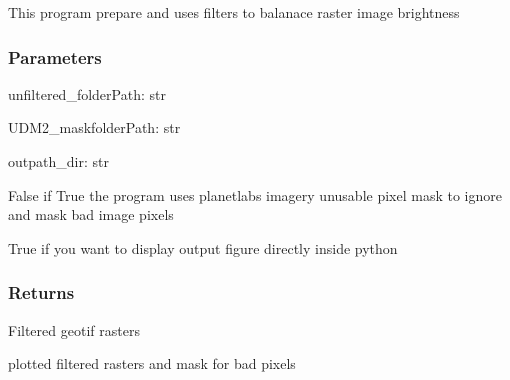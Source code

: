 \documentclass[letterpaper,10pt]{sphinxmanual}
\begin{document}
\begin{fulllineitems}
\label{\detokenize{generated/akhdefo_functions.Filter_PreProcess:akhdefo_functions.Filter_PreProcess}}
\pysigstartsignatures
{}
\pysigstopsignatures
\sphinxAtStartPar
This program prepare and uses filters to balanace raster image brightness


\subsubsection{Parameters}
\label{\detokenize{generated/akhdefo_functions.Filter_PreProcess:parameters}}
\sphinxAtStartPar
unfiltered\_folderPath:  str

\sphinxAtStartPar
UDM2\_maskfolderPath:    str

\sphinxAtStartPar
outpath\_dir:    str
\begin{description}
\sphinxAtStartPar
False if True the program uses planetlabs imagery unusable pixel mask to ignore and mask bad image pixels

\sphinxAtStartPar
True if you want to display output figure directly inside python

\end{description}


\subsubsection{Returns}
\label{\detokenize{generated/akhdefo_functions.Filter_PreProcess:returns}}\begin{description}
\sphinxAtStartPar
Filtered geotif rasters

\sphinxAtStartPar
plotted filtered rasters and mask for bad pixels

\end{description}

\end{fulllineitems}
\end{document}
